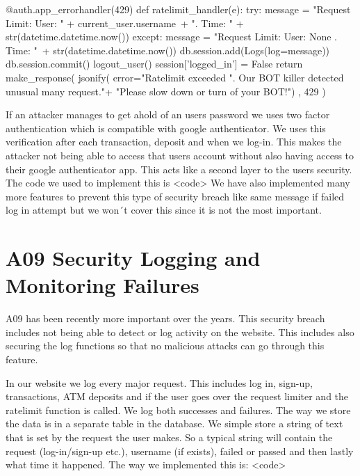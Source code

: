 \begin{python}
@auth.app_errorhandler(429)
def ratelimit_handler(e):
    try:
        message = "Request Limit: User: " + current_user.username\
                  + ". Time: " + str(datetime.datetime.now())
    except:
        message = "Request Limit: User: None . Time: "\
                  + str(datetime.datetime.now())
    db.session.add(Logs(log=message))
    db.session.commit()
    logout_user()
    session['logged_in'] = False
    return make_response(
        jsonify(
            error="Ratelimit exceeded %
                  ". Our BOT killer detected unusual many request."+
                  "Please slow down or turn of your BOT!")
        , 429
    )
\end{python}

If an attacker manages to get ahold of an users password we uses two factor authentication which is compatible with google authenticator. We uses this verification after each transaction, deposit and when we log-in. This makes the attacker not being able to access that users account without also having access to their google authenticator app. This acts like a second layer to the users security.  The code we used to implement this is <code>
We have also implemented many more features to prevent this type of security breach like same message if failed log in attempt but we won´t cover this since it is not the most important. 

\section{A09 Security Logging and Monitoring Failures}

A09 has been recently more important over the years. This security breach includes not being able to detect or log activity on the website. This includes also securing the log functions so that no malicious attacks can go through this feature. 

In our website we log every major request. This includes log in, sign-up, transactions, ATM deposits and if the user goes over the request limiter and the ratelimit function is called. We log both successes and failures. The way we store the data is in a separate table in the database. We simple store a string of text that is set by the request the user makes. So a typical string will contain the request (log-in/sign-up etc.), username (if exists), failed or passed and then lastly what time it happened. The way we implemented this is: <code>

